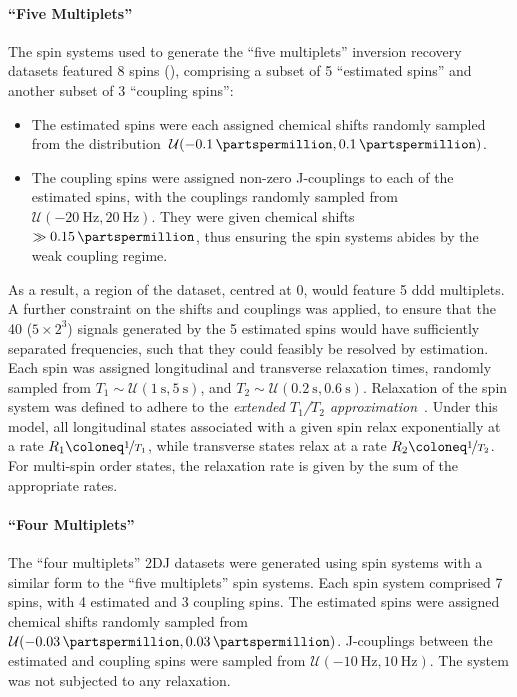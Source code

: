 \paragraph{``Five Multiplets''}
The spin systems used to generate the ``five multiplets'' inversion recovery
datasets featured 8 spins (), comprising a subset of 5 ``estimated
spins'' and another subset of 3 ``coupling spins'':
\begin{itemize}
    \item The estimated spins were each assigned chemical shifts randomly
        sampled from the distribution
        \,$\mathcal{U}(\qty{-0.1}{\partspermillion}, \qty{0.1}{\partspermillion})$.
    \item The coupling spins were assigned non-zero J-couplings to each of the
        estimated spins, with the couplings randomly sampled from
        \,$\mathcal{U}(\qty{-20}{\hertz}, \qty{20}{\hertz})$.
        They were given chemical shifts $\gg
        \qty{0.15}{\partspermillion}$, thus ensuring the spin systems abides by
        the weak coupling regime.
\end{itemize}
As a result, a region of the dataset, centred at \qty{0}{\partspermillion},
would feature 5 ddd multiplets.
A further constraint on the shifts and couplings was applied, to ensure
that the 40 ($5 \times 2^3$) signals generated by the 5 estimated spins would
have sufficiently separated frequencies, such that they could feasibly be
resolved by estimation.  Each spin was assigned longitudinal and transverse
relaxation times, randomly sampled from $T_1 \sim \mathcal{U}(\qty{1}{\second},
\qty{5}{\second})$, and $T_2 \sim \mathcal{U}(\qty{0.2}{\second},
\qty{0.6}{\second})$.
Relaxation of the spin system was defined to adhere to the \emph{extended
$T_1$/$T_2$ approximation}~\cite{SpinachRelax}. Under this model, all
longitudinal states associated with a given spin relax exponentially at a rate
$R_1 \coloneq \nicefrac{1}{T_1}$, while transverse states relax at a rate $R_2
\coloneq \nicefrac{1}{T_2}$. For multi-spin order states, the relaxation rate
is given by the sum of the appropriate rates.

\paragraph{``Four Multiplets''}
The ``four multiplets'' \ac{2DJ} datasets were generated using spin systems
with a similar form to the ``five multiplets'' spin systems. Each spin system
comprised 7 spins, with 4 estimated and 3 coupling spins. The estimated spins
were assigned chemical shifts randomly sampled from
$\mathcal{U}(-\qty{0.03}{\partspermillion}, \qty{0.03}{\partspermillion})$.
J-couplings between the estimated and coupling spins were sampled from
$\mathcal{U}(\qty{-10}{\hertz}, \qty{10}{\hertz})$. The system was not
subjected to any relaxation.

